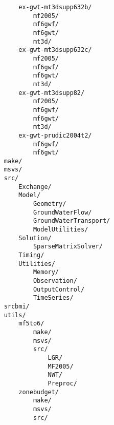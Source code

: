 \begin{verbatim}
        ex-gwt-mt3dsupp632b/ 
            mf2005/ 
            mf6gwf/ 
            mf6gwt/ 
            mt3d/ 
        ex-gwt-mt3dsupp632c/ 
            mf2005/ 
            mf6gwf/ 
            mf6gwt/ 
            mt3d/ 
        ex-gwt-mt3dsupp82/ 
            mf2005/ 
            mf6gwf/ 
            mf6gwt/ 
            mt3d/ 
        ex-gwt-prudic2004t2/ 
            mf6gwf/ 
            mf6gwt/ 
    make/ 
    msvs/ 
    src/ 
        Exchange/ 
        Model/ 
            Geometry/ 
            GroundWaterFlow/ 
            GroundWaterTransport/ 
            ModelUtilities/ 
        Solution/ 
            SparseMatrixSolver/ 
        Timing/ 
        Utilities/ 
            Memory/ 
            Observation/ 
            OutputControl/ 
            TimeSeries/ 
    srcbmi/ 
    utils/ 
        mf5to6/ 
            make/ 
            msvs/ 
            src/ 
                LGR/ 
                MF2005/ 
                NWT/ 
                Preproc/ 
        zonebudget/ 
            make/ 
            msvs/ 
            src/ 
\end{verbatim}
